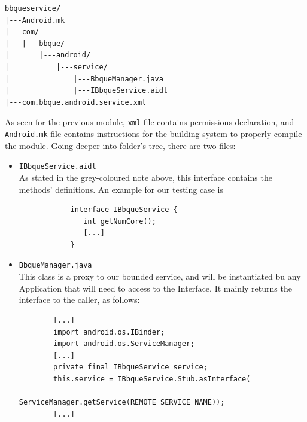 \begin{verbatim}
bbqueservice/
|---Android.mk
|---com/
|   |---bbque/
|       |---android/
|           |---service/
|               |---BbqueManager.java
|               |---IBbqueService.aidl
|---com.bbque.android.service.xml
\end{verbatim}
As seen for the previous module, \texttt{xml} file contains permissions declaration, and \texttt{Android.mk} file contains instructions for the building system to properly compile the module. Going deeper into folder's tree, there are two files:
\begin{itemize}
	\item \texttt{IBbqueService.aidl}\\
		As stated in the grey-coloured note above, this interface contains the methods' definitions. An example for our testing case is
		\begin{verbatim}
			interface IBbqueService {
			   int getNumCore();
			   [...]
			}
		\end{verbatim}
	\item \texttt{BbqueManager.java}\\
	This class is a proxy to our bounded service, and will be instantiated bu any Application that will need to access to the Interface. It mainly returns the interface to the caller, as follows:
	\begin{verbatim}
		[...]
		import android.os.IBinder;
		import android.os.ServiceManager;
		[...]
		private final IBbqueService service;
		this.service = IBbqueService.Stub.asInterface(
		               ServiceManager.getService(REMOTE_SERVICE_NAME));
		[...]
	\end{verbatim}
\end{itemize}

